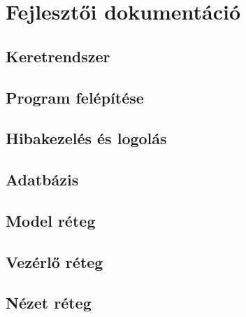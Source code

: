 \chapter{Fejlesztői dokumentáció} %
\label{ch:developer}

\section{Keretrendszer}
\section{Program felépítése}
\section{Hibakezelés és logolás}
\section{Adatbázis}
\section{Model réteg}
\section{Vezérlő réteg}
\section{Nézet réteg}